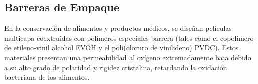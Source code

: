 \subsection{Barreras de Empaque}
En la conservación de alimentos y productos médicos, se diseñan películas multicapa coextruidas con polímeros especiales barrera (tales como el copolímero de etileno-vinil alcohol EVOH y el poli(cloruro de vinilideno) PVDC). Estos materiales presentan una permeabilidad al oxígeno extremadamente baja debido a su alto grado de polaridad y rigidez cristalina, retardando la oxidación bacteriana de los alimentos.
